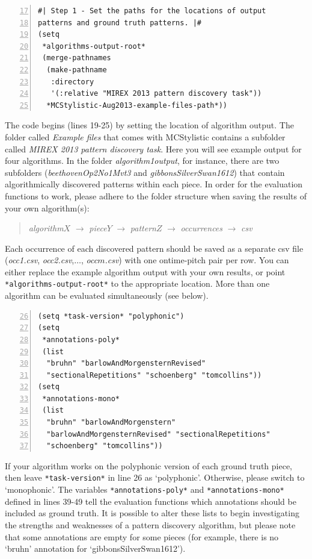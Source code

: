 \begin{Verbatim}[frame=single,numbers=left,firstnumber=17]
#| Step 1 - Set the paths for the locations of output
patterns and ground truth patterns. |#
(setq
 *algorithms-output-root*
 (merge-pathnames
  (make-pathname
   :directory
   '(:relative "MIREX 2013 pattern discovery task"))
  *MCStylistic-Aug2013-example-files-path*))
\end{Verbatim}
The code begins (lines 19-25) by setting the location of algorithm output. The folder called \emph{Example files} that comes with MCStylistic contains a subfolder called \emph{MIREX 2013 pattern discovery task}. Here you will see example output for four algorithms. In the folder \emph{algorithm1output}, for instance, there are two subfolders (\emph{beethovenOp2No1Mvt3} and \emph{gibbonsSilverSwan1612}) that contain algorithmically discovered patterns within each piece. In order for the evaluation functions to work, please adhere to the folder structure when saving the results of your own algorithm(s):
\begin{quotation}
\emph{algorithm$X$} $\rightarrow$ \emph{piece$Y$} $\rightarrow$ \emph{pattern$Z$} $\rightarrow$ \emph{occurrences} $\rightarrow$ \emph{csv}
\end{quotation}
Each occurrence of each discovered pattern should be saved as a separate csv file (\emph{occ1.csv}, \emph{occ2.csv},$\ldots$, \emph{occ$m$.csv}) with one ontime-pitch pair per row. You can either replace the example algorithm output with your own results, or point \texttt{*algorithms-output-root*} to the appropriate location. More than one algorithm can be evaluated simultaneously (see below).

\begin{Verbatim}[frame=single,numbers=left,firstnumber=26]
(setq *task-version* "polyphonic")
(setq
 *annotations-poly*
 (list
  "bruhn" "barlowAndMorgensternRevised"
  "sectionalRepetitions" "schoenberg" "tomcollins"))
(setq
 *annotations-mono*
 (list
  "bruhn" "barlowAndMorgenstern"
  "barlowAndMorgensternRevised" "sectionalRepetitions"
  "schoenberg" "tomcollins"))
\end{Verbatim}
If your algorithm works on the polyphonic version of each ground truth piece, then leave \texttt{*task-version*} in line 26 as `polyphonic'. Otherwise, please switch to `monophonic'. The variables \texttt{*annotations-poly*} and \texttt{*annotations-mono*} defined in lines 39-49 tell the evaluation functions which annotations should be included as ground truth. It is possible to alter these lists to begin investigating the strengths and weaknesses of a pattern discovery algorithm, but please note that some annotations are empty for some pieces (for example, there is no `bruhn' annotation for `gibbonsSilverSwan1612').

